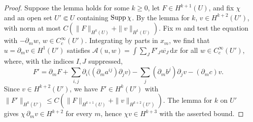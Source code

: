 \begin{proof}
Suppose the lemma holds for some $k\geq0$, let $F\in H^{k+1}(U)$, and fix $\chi$ and an open set $U'\Subset U$ containing $\operatorname{Supp}\chi$. By the lemma for $k$, $v\in H^{k+2}(U')$, with norm at most $C(\|F\|_{H^k(U)}+\|v\|_{H^1(U)})$. Fix $m$ and test the equation with $-\partial_mw$, $w\in C^\infty_c(U')$. Integrating by parts in $x_m$, we find that $u=\partial_mv\in H^1(U')$ satisfies $\mathcal A(u,w)=\int\sum_JF'_J\overline{w_J}\,\mathrm dx$ for all $w\in C^\infty_c(U')$, where, with the indices $I,J$ suppressed,
\[
 F'=\partial_mF+\sum_{i,j}\partial_i\bigl((\partial_ma^{ij})\partial_jv\bigr)-\sum_j(\partial_mb^j)\partial_jv-(\partial_mc)v.
\]
Since $v\in H^{k+2}(U')$, we have $F'\in H^k(U')$ with $\|F'\|_{H^k(U')}\leq C(\|F\|_{H^{k+1}(U)}+\|v\|_{H^{k+2}(U')})$. The lemma for $k$ on $U'$ gives $\chi\,\partial_mv\in H^{k+2}$ for every $m$, hence $\chi v\in H^{k+3}$ with the asserted bound.
\end{proof}


